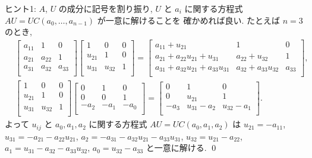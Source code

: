 \documentclass[12pt,twoside]{jarticle}
\begin{document}
\noindent
ヒント1: $A$, $U$ の成分に記号を割り振り, 
$U$ と $a_i$ に関する方程式 $AU=UC(a_0,\dots,a_{n-1})$ が一意に解けることを
確かめれば良い.  たとえば $n=3$ のとき,
\begin{align*}
  &
  \begin{bmatrix}
    a_{11} & 1      & 0 \\
    a_{21} & a_{22} & 1 \\
    a_{31} & a_{32} & a_{33} \\
  \end{bmatrix}
  \begin{bmatrix}
    1      & 0      & 0 \\
    u_{21} & 1      & 0 \\
    u_{31} & u_{32} & 1 \\
  \end{bmatrix}
  = 
  \begin{bmatrix}
    a_{11}+u_{21}                    & 1                   & 0 \\
    a_{21}+a_{22}u_{21}+u_{31}       & a_{22}+u_{32}       & 1 \\
    a_{31}+a_{32}u_{21}+a_{33}u_{31} & a_{32}+a_{33}u_{32} & a_{33} \\
  \end{bmatrix},
  \\ &
  \begin{bmatrix}
    1      & 0      & 0 \\
    u_{21} & 1      & 0 \\
    u_{31} & u_{32} & 1 \\
  \end{bmatrix}
  \begin{bmatrix}
    0    & 1    & 0 \\
    0    & 0    & 1 \\
    -a_2 & -a_1 & -a_0 \\
  \end{bmatrix}
  =
  \begin{bmatrix}
    0    & 1          & 0 \\
    0    & u_{21}     & 1 \\
    -a_3 & u_{31}-a_2 & u_{32}-a_1 \\
  \end{bmatrix}.
\end{align*}
よって $u_{ij}$ と $a_0,a_1,a_2$ に関する方程式 $AU=UC(a_0,a_1,a_2)$ 
は $u_{21}=-a_{11}$, 
$u_{31}=-a_{21}-a_{22}u_{21}$, 
$a_2 = -a_{31}-a_{32}u_{21}-a_{33}u_{31}$, 
$u_{32}=u_{21}-a_{22}$, 
$a_1=u_{31}-a_{32}-a_{33}u_{32}$,
$a_0=u_{32}-a_{33}$ と一意に解ける.
\qed
\end{document}
